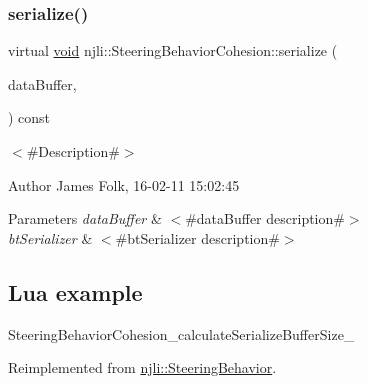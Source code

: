 \mbox{\label{classnjli_1_1_steering_behavior_cohesion_a548183e74a5af18a73001cbb787b318e}} 
\subsubsection{\texorpdfstring{serialize()}{serialize()}}
{\footnotesize\ttfamily virtual \mbox{\hyperlink{_thread_8h_af1e856da2e658414cb2456cb6f7ebc66}{void}} njli\+::\+Steering\+Behavior\+Cohesion\+::serialize (\begin{DoxyParamCaption}\item[{\mbox{\hyperlink{_thread_8h_af1e856da2e658414cb2456cb6f7ebc66}{void}} $\ast$}]{data\+Buffer,  }\item[{bt\+Serializer $\ast$}]{ }\end{DoxyParamCaption}) const\hspace{0.3cm}{\ttfamily [virtual]}}



$<$\#\+Description\#$>$ 

\begin{DoxyAuthor}{Author}
James Folk, 16-\/02-\/11 15\+:02\+:45
\end{DoxyAuthor}

\begin{DoxyParams}{Parameters}
{\em data\+Buffer} & $<$\#data\+Buffer description\#$>$ \\
\hline
{\em bt\+Serializer} & $<$\#bt\+Serializer description\#$>$\\
\hline
\end{DoxyParams}
\hypertarget{classnjli_1_1_steering_behavior_wander_ex1}{}\subsection{Lua example}\label{classnjli_1_1_steering_behavior_wander_ex1}

\begin{DoxyCodeInclude}
\end{DoxyCodeInclude}
Steering\+Behavior\+Cohesion\+\_\+calculate\+Serialize\+Buffer\+Size\+\_\+ 

Reimplemented from \mbox{\hyperlink{classnjli_1_1_steering_behavior_aa8494cb4a327c0040f64cfe8b393786e}{njli\+::\+Steering\+Behavior}}.

